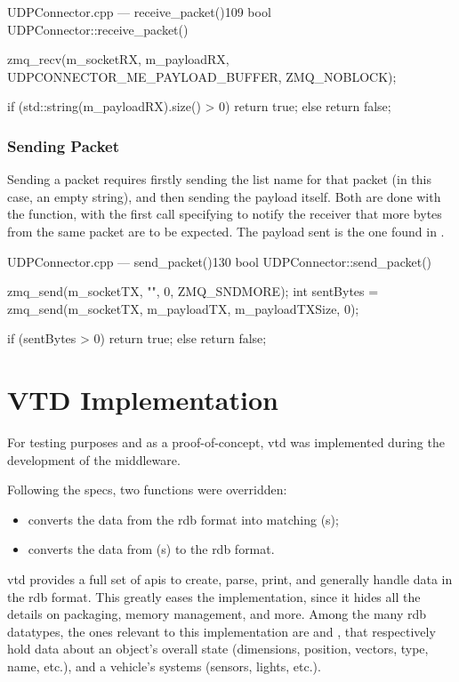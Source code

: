 \begin{codelist}{UDPConnector.cpp --- receive\_packet()}{109}
bool UDPConnector::receive_packet() {
	zmq_recv(m_socketRX, m_payloadRX, UDPCONNECTOR_ME_PAYLOAD_BUFFER, ZMQ_NOBLOCK);

	if (std::string(m_payloadRX).size() > 0)
		return true;
	else
		return false;
}
\end{codelist}

\subsubsection{Sending Packet}

Sending a \gls{packet} requires firstly sending the list name for that \gls{packet} (in this case, an empty string), and then sending the \gls{payload} itself. Both are done with the  function, with the first call specifying  to notify the receiver that more bytes from the same \gls{packet} are to be expected. The \gls{payload} sent is the one found in .

\begin{codelist}{UDPConnector.cpp --- send\_packet()}{130}
bool UDPConnector::send_packet() {
	zmq_send(m_socketTX, "", 0, ZMQ_SNDMORE);
	int sentBytes = zmq_send(m_socketTX, m_payloadTX, m_payloadTXSize, 0);

	if (sentBytes > 0)
		return true;
	else
		return false;
}
\end{codelist}

\section{VTD Implementation}\label{sc:middleware:implementation}

For testing purposes and as a proof-of-concept, \gls{vtd} was implemented during the development of the \gls{middleware}.

Following the specs, two functions were overridden:

\begin{itemize}
	\item {} converts the data from the \gls{rdb} format into matching (s);
	\item {} converts the data from (s) to the \gls{rdb} format.
\end{itemize}

\gls{vtd} provides a full set of \glspl{api} to create, parse, print, and generally handle data in the \gls{rdb} format. This greatly eases the implementation, since it hides all the details on packaging, memory management, and more. Among the many \gls{rdb} datatypes, the ones relevant to this implementation are  and , that respectively hold data about an object's overall state (dimensions, position, vectors, type, name, etc.), and a vehicle's systems (sensors, lights, etc.).

